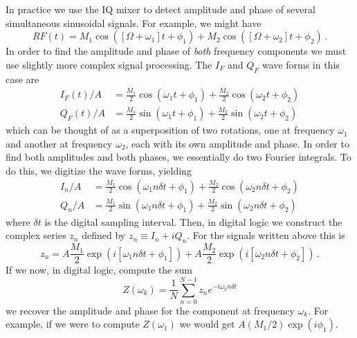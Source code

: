 
In practice we use the IQ mixer to detect amplitude and phase of several simultaneous sinusoidal signals.
For example, we might have
\begin{equation}
RF(t) = M_1 \cos([\Omega + \omega_1] t + \phi_1 ) + M_2 \cos([\Omega + \omega_2] t + \phi_2) \, .
\end{equation}
In order to find the amplitude and phase of \emph{both} frequency components we must use slightly more complex signal processing.
The $I_F$ and $Q_F$ wave forms in this case are
\begin{align}
I_F(t)/A &= \frac{M_1}{2} \cos(\omega_1 t + \phi_1) + \frac{M_2}{2} \cos(\omega_2 t + \phi_2) \\
Q_F(t)/A &= \frac{M_1}{2} \sin(\omega_1 t + \phi_1) + \frac{M_2}{2} \sin(\omega_2 t + \phi_2)
\end{align}
which can be thought of as a superposition of two rotations, one at frequency $\omega_1$ and another at frequency $\omega_2$, each with its own amplitude and phase.
In order to find both amplitudes and both phases, we essentially do two Fourier integrals.
To do this, we digitize the wave forms, yielding
\begin{align}
I_n/A &= \frac{M_1}{2} \cos(\omega_1 n \delta t + \phi_1) + \frac{M_2}{2} \cos(\omega_2 n \delta t + \phi_2) \\
Q_n/A &= \frac{M_1}{2} \sin(\omega_1 n \delta t + \phi_1) + \frac{M_2}{2} \sin(\omega_2 n \delta t + \phi_2)
\end{align}
where $\delta t$ is the digital sampling interval.
Then, in digital logic we construct the complex series $z_n$ defined by $z_n \equiv I_n + i Q_n$.
For the signals written above this is
\begin{equation}
z_n =
  A \frac{M_1}{2} \exp \left( i \left[ \omega_1 n \delta t + \phi_1 \right] \right)
+ A \frac{M_2}{2} \exp \left( i \left[ \omega_2 n \delta t + \phi_2 \right] \right) \, .
\end{equation}
If we now, in digital logic, compute the sum
\begin{equation}
Z(\omega_k) = \frac{1}{N}\sum_{n=0}^{N-1} z_n e^{-i \omega_k n \delta t}
\end{equation}
we recover the amplitude and phase for the component at frequency $\omega_k$.
For example, if we were to compute $Z(\omega_1)$ we would get $A (M_1/2) \exp(i \phi_1)$.
